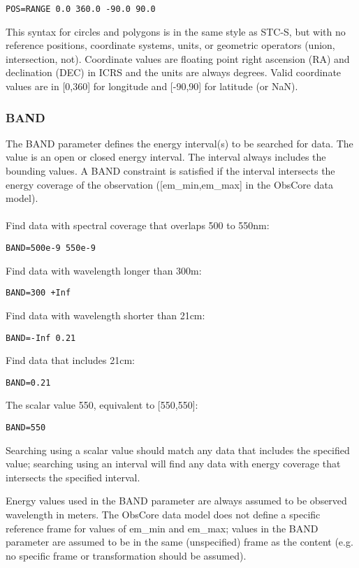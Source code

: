 \documentclass[11pt,a4paper]{ivoa}
\begin{document}
\begin{lstlisting}
POS=RANGE 0.0 360.0 -90.0 90.0
\end{lstlisting}


This syntax for circles and polygons is in the same style as STC-S, but with no reference positions, coordinate systems, units, or geometric operators (union, intersection, not). Coordinate values are floating point right ascension (RA) and declination (DEC) in ICRS and the units are always degrees. Valid coordinate values are in [0,360] for longitude and [-90,90] for latitude (or NaN).

\subsubsection{BAND}
\label{sec:BAND}

The BAND parameter defines the energy interval(s) to be searched for data. The value is an open or closed energy interval. The interval always includes the bounding values. A BAND constraint is satisfied if the interval intersects the energy coverage of the observation ([em\_min,em\_max] in the ObsCore data model). \\ \\
Find data with spectral coverage that overlaps 500 to 550nm:

\begin{lstlisting}
BAND=500e-9 550e-9
\end{lstlisting}
Find data with wavelength longer than 300m:
\begin{lstlisting}
BAND=300 +Inf
\end{lstlisting}
Find data with wavelength shorter than 21cm:
\begin{lstlisting}
BAND=-Inf 0.21
\end{lstlisting}
Find data that includes 21cm:
\begin{lstlisting}
BAND=0.21
\end{lstlisting}
The scalar value 550, equivalent to [550,550]:
\begin{lstlisting}
BAND=550
\end{lstlisting}


Searching using a scalar value should match any data that includes the specified value; searching using an interval will find any data with energy coverage that intersects the specified interval.

Energy values used in the BAND parameter are always assumed to be  observed wavelength in meters. The ObsCore data model does not define a specific reference frame for values of em\_min and em\_max; values in the BAND parameter are assumed to be in the same (unspecified) frame as the content (e.g. no specific frame or transformation should be assumed).
\end{document}
